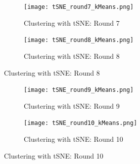 \documentclass[a4paper,11pt]{article}
\begin{document}
\begin{mlsolution}
\begin{figure}[!htbp]
	\begin{subfigure}{.5\textwidth}
		\centering
		\texttt{[image: tSNE\_round7\_kMeans.png]}
		\caption{Clustering with tSNE: Round 7}
		\label{tSNE7}
	\end{subfigure}%
	\begin{subfigure}{.5\textwidth}
		\centering
		\texttt{[image: tSNE\_round8\_kMeans.png]}
		\caption{Clustering with tSNE: Round 8}
		\label{tSNE8}
	\end{subfigure}
\end{figure}

\begin{figure}[!htbp]
	\begin{subfigure}{.5\textwidth}
		\centering
		\texttt{[image: tSNE\_round9\_kMeans.png]}
		\caption{Clustering with tSNE: Round 9}
		\label{tSNE9}
	\end{subfigure}%
	\begin{subfigure}{.5\textwidth}
		\centering
		\texttt{[image: tSNE\_round10\_kMeans.png]}
		\caption{Clustering with tSNE: Round 10}
		\label{tSNE10}
	\end{subfigure}
\end{figure}


\end{mlsolution}
\end{document}
